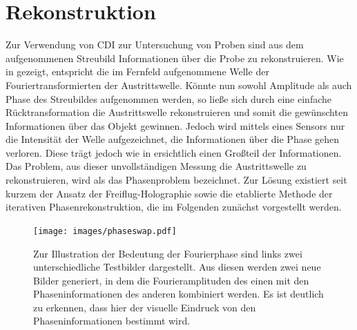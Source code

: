 \chapter{Rekonstruktion}
\label{chap:rekonstruktion}
Zur Verwendung von CDI zur Untersuchung von Proben sind aus dem aufgenommenen Streubild Informationen über die Probe zu rekonstruieren. Wie in  gezeigt, entspricht die im Fernfeld aufgenommene Welle der Fouriertransformierten der Austrittswelle. Könnte nun sowohl Amplitude als auch Phase des Streubildes aufgenommen werden, so ließe sich durch eine einfache Rücktransformation die Austrittswelle rekonstruieren und somit die gewünschten Informationen über das Objekt gewinnen. Jedoch wird mittels eines Sensors nur die Intensität der Welle aufgezeichnet, die Informationen über die Phase gehen verloren. Diese trägt jedoch wie in  ersichtlich einen Großteil der Informationen. Das Problem, aus dieser unvollständigen Messung die Austrittswelle zu rekonstruieren, wird als das Phasenproblem bezeichnet. Zur Lösung existiert seit kurzem der Ansatz der Freiflug-Holographie sowie die etablierte Methode der iterativen Phasenrekonstruktion, die im Folgenden zunächst vorgestellt werden.

\begin{figure}
	\centering
	\texttt{[image: images/phaseswap.pdf]}
	\caption[Bedeutung der Fourierphase]{Zur Illustration der Bedeutung der Fourierphase sind links zwei unterschiedliche Testbilder dargestellt. Aus diesen werden zwei neue Bilder generiert, in dem die Fourieramplituden des einen mit den Phaseninformationen des anderen kombiniert werden. Es ist deutlich zu erkennen, dass hier der visuelle Eindruck von den Phaseninformationen bestimmt wird.}
	\label{fig:phaseswap}
\end{figure}

